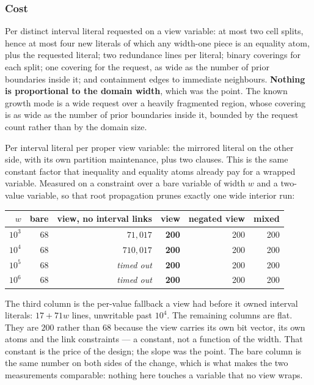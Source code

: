 \documentclass[11pt,a4paper]{article}
\theoremstyle{plain}
\theoremstyle{definition}
\theoremstyle{remark}
\begin{document}
\subsubsection*{Cost}
\label{sec:cost}

Per distinct interval literal requested on a view variable: at most two cell
splits, hence at most four new literals of which any width-one piece is an
equality atom, plus the requested literal; two redundance lines per literal;
binary coverings for each split; one covering for the request, as wide as the
number of prior boundaries inside it; and containment edges to immediate
neighbours.  \textbf{Nothing is proportional to the domain width}, which was the
point.  The known growth mode is a wide request over a heavily fragmented
region, whose covering is as wide as the number of prior boundaries inside it,
bounded by the request count rather than by the domain size.

Per interval literal per proper view variable: the mirrored literal on the
other side, with its own partition maintenance, plus two clauses.  This is the
same constant factor that inequality and equality atoms already pay for a
wrapped variable.  Measured on a constraint over a bare variable of width $w$
and a two-value variable, so that root propagation prunes exactly one wide
interior run:

\begin{center}
\small
\begin{tabular}{@{}rrrrrr@{}}
\toprule
$w$ & bare & view, no interval links & view & negated view & mixed \\
\midrule
$10^3$ & 68 & $71{,}017$ & \textbf{200} & 200 & 200 \\
$10^4$ & 68 & $710{,}017$ & \textbf{200} & 200 & 200 \\
$10^5$ & 68 & \emph{timed out} & \textbf{200} & 200 & 200 \\
$10^6$ & 68 & \emph{timed out} & \textbf{200} & 200 & 200 \\
\bottomrule
\end{tabular}
\end{center}

The third column is the per-value fallback a view had before it owned interval
literals: $17+71w$ lines, unwritable past $10^4$.  The remaining columns are flat.
They are $200$ rather than $68$ because the view carries its own bit vector, its
own atoms and the link constraints --- a constant, not a function of the width.  That
constant is the price of the design; the slope was the point.  The bare column is
the same number on both sides of the change, which is what makes the two
measurements comparable: nothing here touches a variable that no view wraps.
\end{document}
